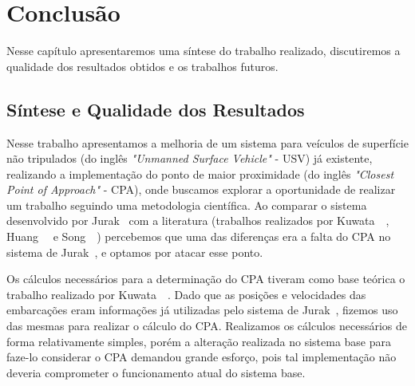\chapter{Conclusão}\label{chap6:conclusao}
    Nesse capítulo apresentaremos uma síntese do trabalho realizado, discutiremos a qualidade dos resultados obtidos e os trabalhos futuros.
    
    \section{Síntese e Qualidade dos Resultados}\label{}
        Nesse trabalho apresentamos a melhoria de um sistema para veículos de superfície não tripulados (do inglês \textit{"Unmanned Surface Vehicle"} - USV) já existente, realizando a implementação do ponto de maior proximidade (do inglês \textit{"Closest Point of Approach"} - CPA), onde buscamos explorar a oportunidade de realizar um trabalho seguindo uma metodologia científica. Ao comparar o sistema desenvolvido por Jurak~\cite{Jurak2020COLREGS} com a literatura (trabalhos realizados por Kuwata~\etal~\cite{Kuwata2014Safe}, Huang~\etal~\cite{Huang2019Generalized} e Song~\etal~\cite{Song2018Two-level}) percebemos que uma das diferenças era a falta do CPA no sistema de Jurak~\cite{Jurak2020COLREGS}, e optamos por atacar esse ponto. 
        
        Os cálculos necessários para a determinação do CPA tiveram como base teórica o trabalho realizado por Kuwata~\etal~\cite{Kuwata2014Safe}. Dado que as posições e velocidades das embarcações eram informações já utilizadas pelo sistema de Jurak~\cite{Jurak2020COLREGS}, fizemos uso das mesmas para realizar o cálculo do CPA. Realizamos os cálculos necessários de forma relativamente simples, porém a 
        alteração realizada no sistema base para faze-lo considerar o CPA demandou grande esforço, pois tal implementação não deveria comprometer o funcionamento atual do sistema base. 
        
